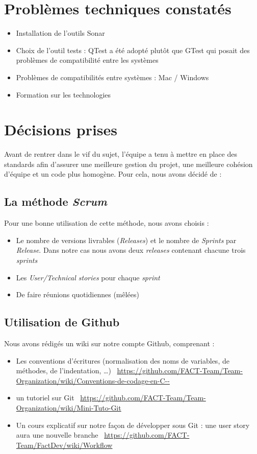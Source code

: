 \documentclass[12pt,a4paper,openany]{article}
\begin{document}
	\section{Problèmes techniques constatés}
	\begin{itemize}
		\item Installation de l'outils Sonar
		\item Choix de l'outil tests : QTest a été adopté plutôt que GTest qui posait des problèmes de compatibilité entre les systèmes 
		\item Problèmes de compatibilités entre systèmes : Mac / Windows
		\item Formation sur les technologies
	\end{itemize}
	\section{Décisions prises}
	Avant de rentrer dans le vif du sujet, l'équipe a tenu à mettre en place des standards afin d’assurer une meilleure gestion du projet, une
	meilleure cohésion d’équipe et un code plus homogène. Pour cela, nous avons décidé de :
	\subsection{La méthode \textit{Scrum}}
	Pour une bonne utilisation de cette méthode, nous avons choisis : 
	\begin{itemize}
		\item Le nombre de versions livrables (\textit{Releases}) et le nombre de \textit{Sprints} par \textit{Release}. Dans notre cas nous avons
			deux \textit{releases} contenant chacune trois \textit{sprints}
		\item Les \textit{User/Technical stories} pour chaque \textit{sprint}
		\item De faire réunions quotidiennes (mêlées)
	\end{itemize}

	\subsection{Utilisation de Github}
	Nous avons rédigés un wiki sur notre compte Github, comprenant :
	\begin{itemize}
		\item Les conventions d’écritures (normalisation des noms de variables, de méthodes, de l'indentation, \ldots)\newline
			\Mundus~\url{https://github.com/FACT-Team/Team-Organization/wiki/Conventions-de-codage-en-C--}
		\item un tutoriel sur Git\newline
			\Mundus~\url{https://github.com/FACT-Team/Team-Organization/wiki/Mini-Tuto-Git}
		\item Un cours explicatif sur notre façon de développer sous Git : une user story aura une nouvelle branche \newline
			\Mundus~\url{https://github.com/FACT-Team/FactDev/wiki/Workflow}
	\end{itemize}
\end{document}
